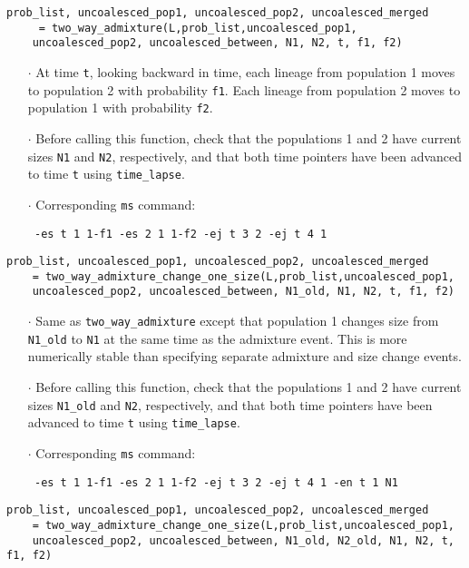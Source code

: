 \documentclass[12pt]{article}
\begin{document}
\begin{Verbatim}
prob_list, uncoalesced_pop1, uncoalesced_pop2, uncoalesced_merged
	 = two_way_admixture(L,prob_list,uncoalesced_pop1, 
	uncoalesced_pop2, uncoalesced_between, N1, N2, t, f1, f2)
\end{Verbatim}

\begin{enumerate}
\item[$\cdot$] At time \texttt{t}, looking backward in time, each lineage from population 1 moves to population 2 with probability \texttt{f1}. Each lineage from population 2 moves to population 1 with probability \texttt{f2}.
\item[$\cdot$] Before calling this function, check that the populations 1 and 2 have current sizes \texttt{N1} and \texttt{N2}, respectively, and that both time pointers have been advanced to time \texttt{t} using \verb|time_lapse|.
\item[$\cdot$]Corresponding \texttt{ms} command: 

\verb| -es t 1 1-f1 -es 2 1 1-f2 -ej t 3 2 -ej t 4 1|
\end{enumerate}
\vspace{0.5 cm}

\begin{Verbatim}
prob_list, uncoalesced_pop1, uncoalesced_pop2, uncoalesced_merged 
	= two_way_admixture_change_one_size(L,prob_list,uncoalesced_pop1, 
	uncoalesced_pop2, uncoalesced_between, N1_old, N1, N2, t, f1, f2)
\end{Verbatim}

\begin{enumerate}
\item[$\cdot$] Same as \verb|two_way_admixture| except that population 1 changes size from \verb|N1_old| to \verb|N1| at the same time as the admixture event. This is more numerically stable than specifying separate admixture and size change events. 
\item[$\cdot$] Before calling this function, check that the populations 1 and 2 have current sizes \verb|N1_old| and \texttt{N2}, respectively, and that both time pointers have been advanced to time \texttt{t} using \verb|time_lapse|.
\item[$\cdot$]Corresponding \texttt{ms} command: 

\verb| -es t 1 1-f1 -es 2 1 1-f2 -ej t 3 2 -ej t 4 1 -en t 1 N1|
\end{enumerate}
\vspace{0.5 cm}

\begin{Verbatim}
prob_list, uncoalesced_pop1, uncoalesced_pop2, uncoalesced_merged 
	= two_way_admixture_change_one_size(L,prob_list,uncoalesced_pop1, 
	uncoalesced_pop2, uncoalesced_between, N1_old, N2_old, N1, N2, t, f1, f2)
\end{Verbatim}
\end{document}
